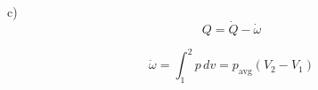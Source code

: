 c)
\[
Q = \dot{Q} - \dot{\omega}
\]

\[
\dot{\omega} = \int_{1}^{2} p \, dv = p_{\text{avg}} (V_2 - V_1)
\]